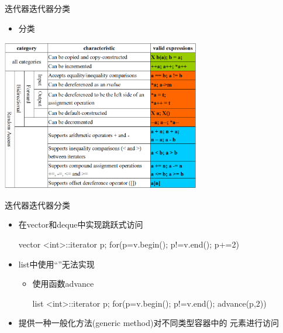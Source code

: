 \begin{frame}[t, fragile]{迭代器}{迭代器分类}%
  \begin{itemize}
  \item 分类 
  \end{itemize}
  \begin{center}
    \includegraphics[width=0.65\textwidth]{figure/chap07/08iterator01}
  \end{center}
\end{frame}

\begin{frame}[t, fragile]{迭代器}{迭代器分类}%
  \stretchon
  \begin{itemize}
  \item 在vector和deque中实现跳跃式访问\\
    \begin{cppcode}
vector <int>::iterator p;
for(p=v.begin(); p!=v.end(); p+=2)
    \end{cppcode}
  \item list中使用“\cppinline{+=}”无法实现
    \begin{itemize}
    \item 使用函数advance\\
      \begin{cppcode}
list <int>::iterator p;
for(p=v.begin(); p!=v.end(); advance(p,2))
      \end{cppcode}
    \end{itemize}
  \item 提供一种\alert{一般化方法(generic method)}对\alert{不同类型容器}中的
      元素\alert{进行访问}
  \end{itemize}
  \stretchoff
\end{frame}

